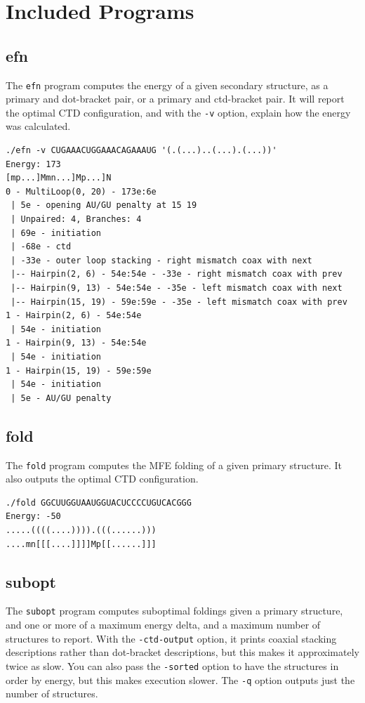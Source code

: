 \documentclass{cshonours}
\begin{document}
\section{Included Programs}
\subsection{efn}
The \texttt{efn} program computes the energy of a given secondary structure, as a primary and dot-bracket pair, or a primary and ctd-bracket pair. It will report the optimal CTD configuration, and with the \texttt{-v} option, explain how the energy was calculated.

\begin{lstlisting}[caption={Efn example},label={lst:efn}]
./efn -v CUGAAACUGGAAACAGAAAUG '(.(...)..(...).(...))'
Energy: 173
[mp...]Mmn...]Mp...]N
0 - MultiLoop(0, 20) - 173e:6e
 | 5e - opening AU/GU penalty at 15 19
 | Unpaired: 4, Branches: 4
 | 69e - initiation
 | -68e - ctd
 | -33e - outer loop stacking - right mismatch coax with next
 |-- Hairpin(2, 6) - 54e:54e - -33e - right mismatch coax with prev
 |-- Hairpin(9, 13) - 54e:54e - -35e - left mismatch coax with next
 |-- Hairpin(15, 19) - 59e:59e - -35e - left mismatch coax with prev
1 - Hairpin(2, 6) - 54e:54e
 | 54e - initiation
1 - Hairpin(9, 13) - 54e:54e
 | 54e - initiation
1 - Hairpin(15, 19) - 59e:59e
 | 54e - initiation
 | 5e - AU/GU penalty
\end{lstlisting}

\subsection{fold}
The \texttt{fold} program computes the MFE folding of a given primary structure. It also outputs the optimal CTD configuration.

\begin{lstlisting}[caption={Fold example},label={lst:fold}]
./fold GGCUUGGUAAUGGUACUCCCCUGUCACGGG
Energy: -50
.....((((....)))).(((......)))
....mn[[[....]]]]Mp[[......]]]
\end{lstlisting}

\subsection{subopt}
The \texttt{subopt} program computes suboptimal foldings given a primary structure, and one or more of a maximum energy delta, and a maximum number of structures to report. With the \texttt{-ctd-output} option, it prints coaxial stacking descriptions rather than dot-bracket descriptions, but this makes it approximately twice as slow. You can also pass the \texttt{-sorted} option to have the structures in order by energy, but this makes execution slower. The \texttt{-q} option outputs just the number of structures.
\end{document}
